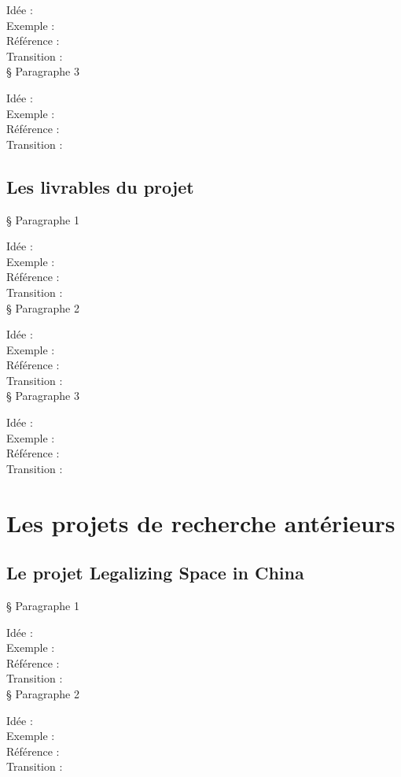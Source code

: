 Idée :\\
Exemple :\\
Référence :\\
Transition :\\

§ Paragraphe 3

Idée :\\
Exemple :\\
Référence :\\
Transition :\\

\subsection{Les livrables du projet}

§ Paragraphe 1

Idée :\\
Exemple :\\
Référence :\\
Transition :\\

§ Paragraphe 2

Idée :\\
Exemple :\\
Référence :\\
Transition :\\

§ Paragraphe 3

Idée :\\
Exemple :\\
Référence :\\
Transition :\\

\section{Les projets de recherche antérieurs}
\subsection{Le projet Legalizing Space in China}

§ Paragraphe 1

Idée :\\
Exemple :\\
Référence :\\
Transition :\\

§ Paragraphe 2

Idée :\\
Exemple :\\
Référence :\\
Transition :\\

